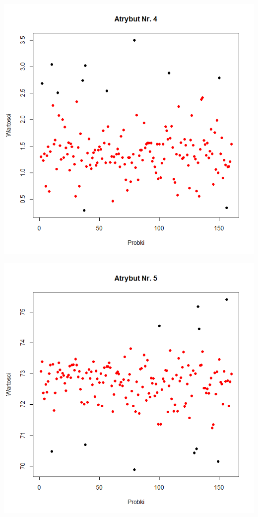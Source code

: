 \documentclass[a4paper,12pt,twoside]{article}
\begin{document}
\begin{center}
\includegraphics[width=.90\textwidth]{img/2_pkt_oddalone_4.png}
\end{center}

\begin{center}
\includegraphics[width=.90\textwidth]{img/2_pkt_oddalone_5.png}
\end{center}
\end{document}
